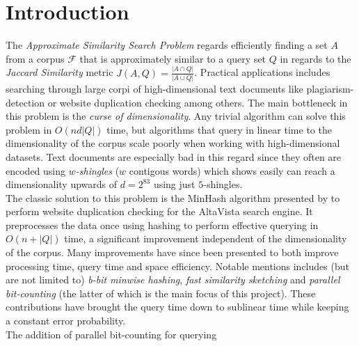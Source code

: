 \section{Introduction}
The \textit{Approximate Similarity Search Problem} regards efficiently finding a set $A$ from a corpus $\mathcal{F}$ that is approximately similar to a query set $Q$ in regards to the \textit{Jaccard Similarity} metric $J(A,Q) = \frac{|A\cap Q|}{|A\cup Q|}$\cite{dahlgaard2017fast}\cite{fast-similarity-search}. Practical applications includes searching through large corpi of high-dimensional text documents like plagiarism-detection or website duplication checking among others\cite{vassilvitskii2018}. The main bottleneck in this problem is the \textit{curse of dimensionality}. Any trivial algorithm can solve this problem in $O(nd|Q|)$ time, but algorithms that query in linear time to the dimensionality of the corpus scale poorly when working with high-dimensional datasets. Text documents are especially bad in this regard since they often are encoded using \textit{$w$-shingles} ($w$ contigous words) which \citet{li2011hashing} shows easily can reach a dimensionality upwards of $d=2^{83}$ using just $5$-shingles.\\
The classic solution to this problem is the MinHash algorithm presented by \citet{broder1997minhash} to perform website duplication checking for the AltaVista search engine. It preprocesses the data once using hashing to perform effective querying in $O(n + |Q|)$ time, a significant improvement independent of the dimensionality of the corpus.
Many improvements have since been presented to both improve processing time, query time and space efficiency. Notable mentions includes (but are not limited to) \textit{b-bit minwise hashing}\cite{ping2011theory}, \textit{fast similarity sketching}\cite{dahlgaard2017fast} and \textit{parallel bit-counting}\cite{fast-similarity-search} (the latter of which is the main focus of this project).
These contributions have brought the query time down to sublinear time while keeping a constant error probability.\\
The addition of parallel bit-counting for querying 
